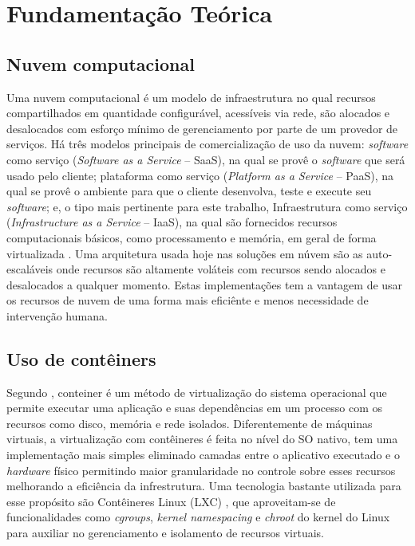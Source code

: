 \chapter{Fundamentação Teórica}

\section{Nuvem computacional}
\label{sec:computacaonuvem}

Uma nuvem computacional é um modelo de infraestrutura no qual recursos compartilhados em quantidade configurável, acessíveis via rede, são alocados e desalocados com esforço mínimo de gerenciamento por parte de um provedor de serviços.
%
Há três modelos principais de comercialização de uso da nuvem: \textit{software} como serviço (\textit{Software as a Service} -- SaaS), na qual se provê o \textit{software} que será usado pelo cliente; plataforma como serviço (\textit{Platform as a Service} -- PaaS), na qual se provê o ambiente para que o cliente desenvolva, teste e execute seu \textit{software}; e, o tipo mais pertinente para este trabalho, Infraestrutura como serviço (\textit{Infrastructure as a Service} -- IaaS), na qual são fornecidos recursos computacionais básicos, como processamento e memória, em geral de forma virtualizada \cite{NIST2011}.
%
Uma arquitetura usada hoje nas soluções em núvem são as auto-escaláveis onde recursos são altamente voláteis com recursos sendo alocados e desalocados a qualquer momento. Estas implementações tem a vantagem de usar os recursos de nuvem de uma forma mais eficiênte e menos necessidade de intervenção humana.


\section{Uso de contêiners}
\label{sec:conteiner}

Segundo \cite{AmazonContainer}, conteiner é um método de virtualização do sistema operacional que permite executar uma aplicação e suas dependências em um processo com os recursos como disco, memória e rede isolados.
%
Diferentemente de máquinas virtuais, a virtualização com contêineres é feita no nível do SO nativo, tem uma implementação mais simples eliminado camadas entre o aplicativo executado e o \textit{hardware} físico permitindo maior granularidade no controle sobre esses recursos melhorando a eficiência da infrestrutura.
%
Uma tecnologia bastante utilizada para esse propósito são Contêineres Linux (LXC) \cite{Linuxcontainers.org2015}, que aproveitam-se de funcionalidades como \textit{cgroups}, \textit{kernel namespacing} e \textit{chroot} do kernel do Linux para auxiliar no gerenciamento e isolamento de recursos virtuais.


